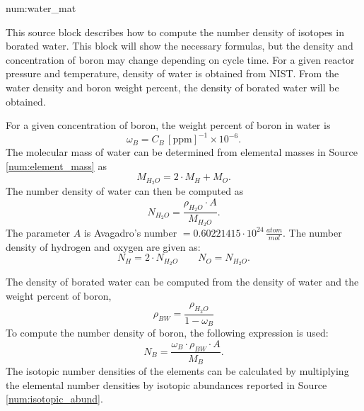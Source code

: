\begin{numitem}{num:water_mat}

    This source block describes how to compute the number density of isotopes in borated water. This block will show the necessary formulas, but the density and concentration of boron may change depending on cycle time. For a given reactor pressure and temperature, density of water is obtained from NIST. From the water density and boron weight percent, the density of borated water will be obtained.
    
    For a given concentration of boron, the weight percent of boron in water is
\[
   \omega_B = C_B\mathrm{\,\left[ppm\right]^{-1}}\times10^{-6}.
\]
The molecular mass of water can be determined from elemental masses in Source \ref{num:element_mass} as
\[
    M_{H_2O} = 2\cdot M_H + M_O.
\]
The number density of water can then be computed as
\[
    N_{H_2O} = \frac{\rho_{H_2O}\cdot A}{M_{H_2O}}.
\]
The parameter $A$ is Avagadro's number $=0.60221415\cdot 10^{24}\,\frac{atom}{mol}$. The number density of hydrogen and oxygen are given as:
\[
    N_H = 2\cdot N_{H_2O} \qquad N_O = N_{H_2O}.
\]

The density of borated water can be computed from the density of water and the weight percent of boron,
\[
    \rho_{BW} = \frac{\rho_{H_2O}}{1 - \omega_B}
\]
To compute the number density of boron, the following expression is used:
\[
    N_B = \frac{\omega_B\cdot\rho_{BW}\cdot A}{M_B}.
\]
The isotopic number densities of the elements can be calculated by multiplying the elemental number densities by isotopic abundances reported in Source \ref{num:isotopic_abund}.


\end{numitem}


